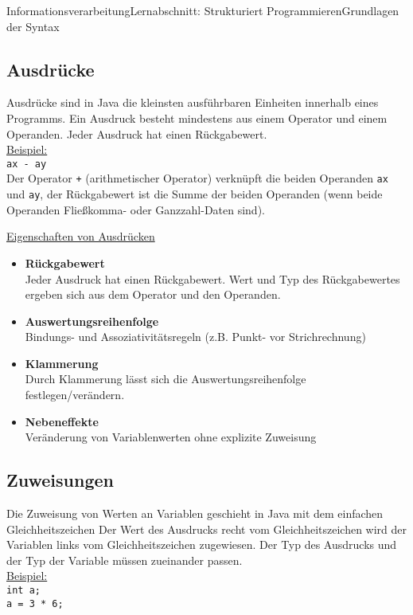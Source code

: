 \documentclass[11pt,oneside,openany,headings=optiontotoc,11pt,numbers=noenddot]{article}
\begin{document}
\begin{worksheet}{Informationsverarbeitung}{Lernabschnitt: Strukturiert Programmieren}{Grundlagen der Syntax}
		\subsection{Ausdrücke}
		Ausdrücke sind in Java die kleinsten ausführbaren Einheiten innerhalb eines Programms. Ein Ausdruck besteht mindestens aus einem Operator und einem Operanden. Jeder Ausdruck hat einen Rückgabewert.\\
		\underline{Beispiel:}\\
		\lstinline[style=Python]|ax - ay|\\
		Der Operator \lstinline[style=Python]|+| (arithmetischer Operator) verknüpft die beiden Operanden \lstinline[style=Python]|ax| und \lstinline[style=Python]|ay|, der Rückgabewert ist die Summe der beiden Operanden (wenn beide Operanden Fließkomma- oder Ganzzahl-Daten sind).\\
		\par\noindent
		\underline{Eigenschaften von Ausdrücken}
		\begin{itemize}
			\item \textbf{Rückgabewert}\\
			Jeder Ausdruck hat einen Rückgabewert. Wert und Typ des Rückgabewertes ergeben sich aus dem Operator und den Operanden.
			\item \textbf{Auswertungsreihenfolge}\\
			Bindungs- und Assoziativitätsregeln (z.B. \grqq{}Punkt- vor Strichrechnung\grqq{})
			\item \textbf{Klammerung}\\
			Durch Klammerung lässt sich die Auswertungsreihenfolge festlegen/verändern.
			\item \textbf{Nebeneffekte}\\
			Veränderung von Variablenwerten ohne explizite Zuweisung
		\end{itemize}
		\subsection{Zuweisungen}
		Die Zuweisung von Werten an Variablen geschieht in Java mit dem einfachen Gleichheitszeichen Der Wert des Ausdrucks recht vom Gleichheitszeichen wird der Variablen links vom Gleichheitszeichen zugewiesen. Der Typ des Ausdrucks und der Typ der Variable müssen zueinander passen.\\
		\underline{Beispiel:}\\
		\lstinline[style=Python]|int a;|\\
		\lstinline[style=Python]|a = 3 * 6;|

\end{worksheet}
\end{document}
